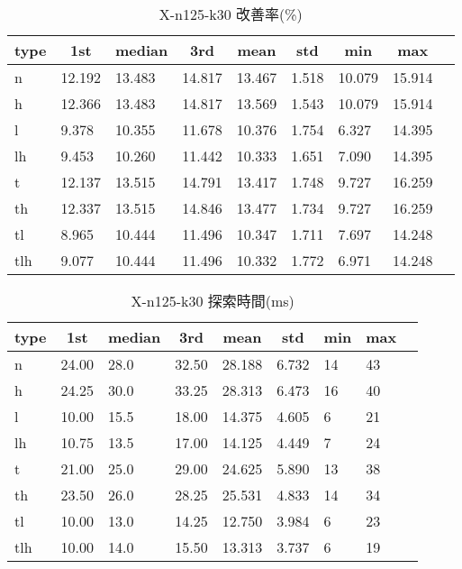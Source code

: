 \begin{table}[htbp]
    \centering
    \caption{X-n125-k30 改善率(\%)}
    \begin{tabular}{|l|l|l|l|l|l|l|l|l|}\hline
    \multicolumn{1}{|c|}{\textbf{type}}
    &\multicolumn{1}{|c|}{\textbf{1st}}
    &\multicolumn{1}{c|}{\textbf{median}}
    &\multicolumn{1}{c|}{\textbf{3rd}}
    &\multicolumn{1}{c|}{\textbf{mean}}
    &\multicolumn{1}{c|}{\textbf{std}}
    &\multicolumn{1}{c|}{\textbf{min}}
    &\multicolumn{1}{c|}{\textbf{max}}\\\hline
	n & 12.192 & 13.483 & 14.817 & 13.467 & 1.518 & 10.079 & 15.914\\\hline
	h & 12.366 & 13.483 & 14.817 & 13.569 & 1.543 & 10.079 & 15.914\\\hline
	l & 9.378 & 10.355 & 11.678 & 10.376 & 1.754 & 6.327 & 14.395\\\hline
	lh & 9.453 & 10.260 & 11.442 & 10.333 & 1.651 & 7.090 & 14.395\\\hline
	t & 12.137 & 13.515 & 14.791 & 13.417 & 1.748 & 9.727 & 16.259\\\hline
	th & 12.337 & 13.515 & 14.846 & 13.477 & 1.734 & 9.727 & 16.259\\\hline
	tl & 8.965 & 10.444 & 11.496 & 10.347 & 1.711 & 7.697 & 14.248\\\hline
	tlh & 9.077 & 10.444 & 11.496 & 10.332 & 1.772 & 6.971 & 14.248\\\hline
	\end{tabular}
\end{table}
\begin{table}[htbp]
    \centering
    \caption{X-n125-k30 探索時間(ms)}
    \begin{tabular}{|l|l|l|l|l|l|l|l|l|}\hline
    \multicolumn{1}{|c|}{\textbf{type}}
    &\multicolumn{1}{|c|}{\textbf{1st}}
    &\multicolumn{1}{c|}{\textbf{median}}
    &\multicolumn{1}{c|}{\textbf{3rd}}
    &\multicolumn{1}{c|}{\textbf{mean}}
    &\multicolumn{1}{c|}{\textbf{std}}
    &\multicolumn{1}{c|}{\textbf{min}}
    &\multicolumn{1}{c|}{\textbf{max}}\\\hline
	n & 24.00 & 28.0 & 32.50 & 28.188 & 6.732 & 14 & 43\\\hline
	h & 24.25 & 30.0 & 33.25 & 28.313 & 6.473 & 16 & 40\\\hline
	l & 10.00 & 15.5 & 18.00 & 14.375 & 4.605 & 6 & 21\\\hline
	lh & 10.75 & 13.5 & 17.00 & 14.125 & 4.449 & 7 & 24\\\hline
	t & 21.00 & 25.0 & 29.00 & 24.625 & 5.890 & 13 & 38\\\hline
	th & 23.50 & 26.0 & 28.25 & 25.531 & 4.833 & 14 & 34\\\hline
	tl & 10.00 & 13.0 & 14.25 & 12.750 & 3.984 & 6 & 23\\\hline
	tlh & 10.00 & 14.0 & 15.50 & 13.313 & 3.737 & 6 & 19\\\hline
	\end{tabular}
\end{table}
